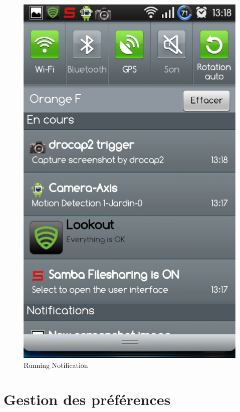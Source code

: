 \begin{figure}[H]
  \label{notifencours}
  \centering
   \includegraphics[scale=0.4]{Images/notifencours.eps}
  \caption{Running Notification}
\end{figure}  
\section{Gestion des préférences}
